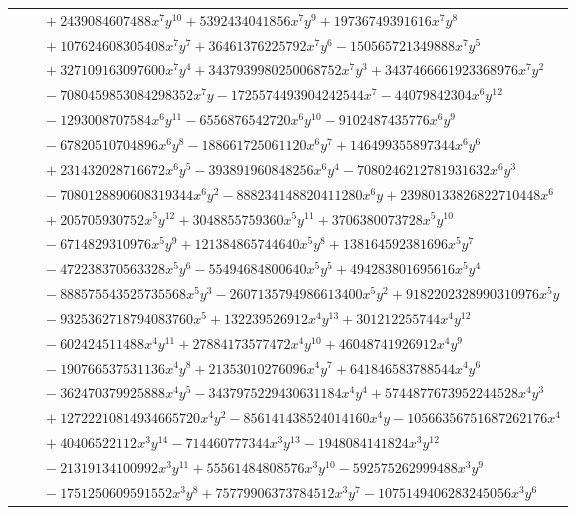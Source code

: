 \documentclass[11pt]{article}
\begin{document}
\begin{longtable}{@{}ll@{}}
 & $\quad +2439084607488x^{7}y^{10}+5392434041856x^{7}y^{9}+19736749391616x^{7}y^{8}$\\
 & $\quad +107624608305408x^{7}y^{7}+36461376225792x^{7}y^{6}-150565721349888x^{7}y^{5}$\\
 & $\quad +327109163097600x^{7}y^{4}+3437939980250068752x^{7}y^{3}+3437466661923368976x^{7}y^{2}$\\
 & $\quad -7080459853084298352x^{7}y-1725574493904242544x^{7}-44079842304x^{6}y^{12}$\\
 & $\quad -1293008707584x^{6}y^{11}-6556876542720x^{6}y^{10}-9102487435776x^{6}y^{9}$\\
 & $\quad -67820510704896x^{6}y^{8}-188661725061120x^{6}y^{7}+146499355897344x^{6}y^{6}$\\
 & $\quad +231432028716672x^{6}y^{5}-393891960848256x^{6}y^{4}-7080246212781931632x^{6}y^{3}$\\
 & $\quad -7080128890608319344x^{6}y^{2}-888234148820411280x^{6}y+23980133826822710448x^{6}$\\
 & $\quad +205705930752x^{5}y^{12}+3048855759360x^{5}y^{11}+3706380073728x^{5}y^{10}$\\
 & $\quad -6714829310976x^{5}y^{9}+121384865744640x^{5}y^{8}+138164592381696x^{5}y^{7}$\\
 & $\quad -472238370563328x^{5}y^{6}-55494684800640x^{5}y^{5}+494283801695616x^{5}y^{4}$\\
 & $\quad -888575543525735568x^{5}y^{3}-2607135794986613400x^{5}y^{2}+9182202328990310976x^{5}y$\\
 & $\quad -9325362718794083760x^{5}+132239526912x^{4}y^{13}+301212255744x^{4}y^{12}$\\
 & $\quad -602424511488x^{4}y^{11}+27884173577472x^{4}y^{10}+46048741926912x^{4}y^{9}$\\
 & $\quad -190766537531136x^{4}y^{8}+21353010276096x^{4}y^{7}+641846583788544x^{4}y^{6}$\\
 & $\quad -362470379925888x^{4}y^{5}-3437975229430631184x^{4}y^{4}+5744877673952244528x^{4}y^{3}$\\
 & $\quad +12722210814934665720x^{4}y^{2}-856141438524014160x^{4}y-10566356751687262176x^{4}$\\
 & $\quad +40406522112x^{3}y^{14}-714460777344x^{3}y^{13}-1948084141824x^{3}y^{12}$\\
 & $\quad -21319134100992x^{3}y^{11}+55561484808576x^{3}y^{10}-592575262999488x^{3}y^{9}$\\
 & $\quad -1751250609591552x^{3}y^{8}+75779906373784512x^{3}y^{7}-1075149406283245056x^{3}y^{6}$\\

\end{longtable}
\end{document}
